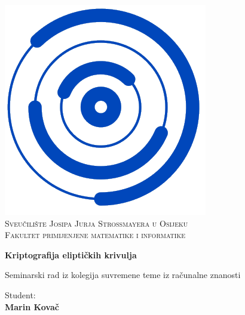 \documentclass{mathos}
\begin{document}
\renewcommand\bibname{Literatura}

\sloppy

\begin{titlepage}
\begin{center}
    \includegraphics[keepaspectratio=true,scale=0.4]{MathosLogo.png} \\ \vspace{1mm}
       \textsc{Sveučilište Josipa Jurja Strossmayera u Osijeku} \\
    \vspace{2mm}
    \textsc{Fakultet primijenjene matematike i informatike}
\end{center}

\vspace{25mm}
\begin{center}
    {\LARGE{\bf  Kriptografija eliptičkih krivulja }}
    
    \vspace{15mm}
    {\large{\sc Seminarski rad iz kolegija}}
    \break
    {\large{\sc suvremene teme iz računalne znanosti}}

\end{center}

\vspace{50mm}

\hfill
\begin{minipage}[t]{0.47\textwidth}\raggedleft
	{{Student:}{\normalsize\vspace{3mm} \bf\\ \large{Marin Kovač}}}
\end{minipage}

\vspace*{\fill}
\end{titlepage}
\end{document}
